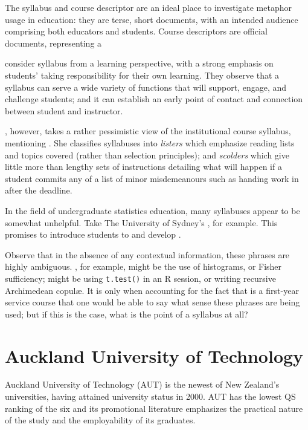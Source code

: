 The syllabus and course descriptor are an ideal place to investigate
metaphor usage in education: they are terse, short documents, with an
intended audience comprising both educators and students.  Course
descriptors are official documents, representing a ~\parencite{luke2013}

 consider syllabus from a learning perspective, with
a strong emphasis on students' taking responsibility for their own
learning.  They observe that a syllabus can serve a wide variety of
functions that will support, engage, and challenge students; and it
can establish an early point of contact and connection between student
and instructor.

, however, takes a rather pessimistic view of the
institutional course syllabus, mentioning .  She classifies syllabuses into \emph{listers} which
emphasize reading lists and topics covered (rather than selection
principles); and \emph{scolders} which give little more than lengthy
sets of instructions detailing what will happen if a student commits
any of a list of minor misdemeanours such as handing work in after the
deadline.

In the field of undergraduate statistics education, many syllabuses
appear to be somewhat unhelpful.  Take The University of Sydney's
, for example.  This promises to introduce students to
 and develop
.

Observe that in the absence of any contextual information, these
phrases are highly ambiguous.  ,
for example, might be the use of histograms, or Fisher sufficiency;
 might be using
\texttt{t.test()} in an R session, or writing recursive Archimedean
copul\ae.  It is only when accounting for the fact that
 is a first-year service course that one would be able
to say what sense these phrases are being used; but if this is the
case, what is the point of a syllabus at all?

\section{Auckland University of Technology}

Auckland University of Technology (AUT) is the newest of New Zealand's
universities, having attained university status in 2000.  AUT has the
lowest QS ranking of the six and its promotional literature emphasizes
the practical nature of the study and the employability of its
graduates.

